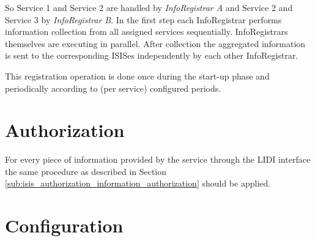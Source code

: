 \documentclass{book}
\begin{document}
So Service 1 and Service 2 are handled by \textit{InfoRegistrar A} and Service 2 and Service 3 by \textit{InfoRegistrar B}.
In the first step each InfoRegistrar performs information collection from all assigned services sequentially. InfoRegistrars themselves are executing in parallel. After collection  the aggregated information is sent to the corresponding ISISes independently by each other InfoRegistrar.

\begin{figure}[ht]
\end{figure}

This registration operation is done once during the start-up phase and periodically according to 
(per service) configured periods.



\section{Authorization}
\label{sec:service_authorization}

For every piece of information provided by the service through the LIDI interface the same procedure as described in 
Section \ref{sub:isis_authorization_information_authorization} should be applied.



\section{Configuration}
\label{sec:service_configuration}
\end{document}

